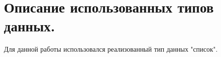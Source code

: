 \section{Описание использованных типов данных.}

Для данной работы использовался реализованный тип данных "список".